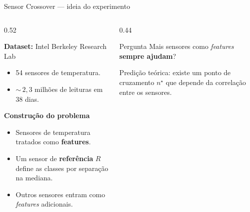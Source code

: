 \documentclass[aspectratio=169, 11pt]{beamer}
\begin{document}
\begin{frame}{Sensor Crossover --- ideia do experimento}

\begin{columns}[T]
\begin{column}{0.52\textwidth}

\textbf{Dataset:} Intel Berkeley Research Lab
\begin{itemize}
  \item 54 sensores de temperatura.
  \item ${\sim}\,2{,}3$ milhões de leituras em 38 dias.
\end{itemize}

\vspace{0.4em}
\textbf{Construção do problema}
\begin{itemize}
  \item Sensores de temperatura tratados como \textbf{features}.
  \item Um sensor de \textbf{referência} $R$ define as classes
        por separação na mediana.
  \item Outros sensores entram como \textit{features} adicionais.
\end{itemize}

\end{column}
\begin{column}{0.44\textwidth}

\begin{block}{Pergunta}
\centering
Mais sensores como \textit{features}\\
\textbf{sempre ajudam}?
\end{block}

\vspace{0.4em}
\small
Predição teórica: existe um ponto de cruzamento $n^{\star}$ que depende da correlação entre os sensores.

\end{column}
\end{columns}

\end{frame}
\end{document}
